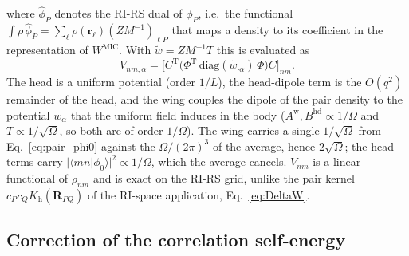 \documentclass[%
 reprint,
superscriptaddress,
 amsmath,amssymb,
 aps,
prb,
]{revtex4-2}
\newcommand{\br}{\mathbf{r}}
\newcommand{\bR}{\mathbf{R}}
\newcommand{\MIC}{\mathrm{MIC}}
\newcommand{\Tr}{\mathrm{T}}
\newcommand{\head}{\mathrm{h}}
\newcommand{\wing}{\mathrm{w}}
\newcommand{\hd}{\mathrm{hd}}
\begin{document}
where $\hat\phi_P$ denotes the RI-RS dual of $\phi_P$, i.e.\ the functional
$\int\rho\,\hat\phi_P = \sum_\ell\rho(\br_\ell)(ZM^{-1})_{\ell P}$ that maps a density to its
coefficient in the representation of $W^\MIC$. With $\tilde w = ZM^{-1}T$ this is evaluated as
\begin{equation}
  V_{nm,\alpha} = \big[C^\Tr\big(\Phi^\Tr\,\mathrm{diag}(\tilde w_{\cdot\alpha})\,\Phi\big)C\big]_{nm}.
  \label{eq:Vnm_grid}
\end{equation}
The head is a uniform potential (order $1/L$), the head-dipole term is the $O(q^2)$
remainder of the head, and the wing couples the dipole of the pair density to the potential
$w_\alpha$ that the uniform field induces in the body ($A^\wing, B^\hd\propto1/\Omega$ and
$T\propto1/\sqrt\Omega$, so both are of order $1/\Omega$). The wing carries a single
$1/\sqrt\Omega$ from Eq.~\eqref{eq:pair_phi0} against the $\Omega/(2\pi)^3$ of the average,
hence $2\sqrt\Omega$; the head terms carry $|\langle mn|\phi_0\rangle|^2\propto1/\Omega$, which
the average cancels. $V_{nm}$ is a linear functional of $\rho_{nm}$ and is exact on the RI-RS
grid, unlike the pair kernel $c_Pc_QK_\head(\bR_{PQ})$ of the RI-space application,
Eq.~\eqref{eq:DeltaW}.

\subsection{Correction of the correlation self-energy}
\label{sec:dSigma3d}
\end{document}
